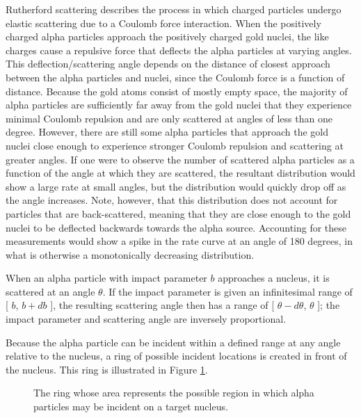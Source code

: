 \documentclass[a4paper]{article}
\begin{document}
\qq Rutherford scattering describes the process in which charged particles
 undergo elastic scattering due to a Coulomb force interaction. When the
positively charged alpha particles approach the positively charged gold nuclei,
the like charges cause a repulsive force that deflects the alpha particles at
varying angles. This deflection/scattering angle depends on the distance of
closest approach between the alpha particles and nuclei, since the Coulomb force
is a function of distance. Because the gold atoms consist of mostly empty space,
the majority of alpha particles are sufficiently far away from the gold nuclei
that they experience minimal Coulomb repulsion and are only scattered at angles
of less than one degree. However, there are still some alpha particles that
approach the gold nuclei close enough to experience stronger Coulomb repulsion
and scattering at greater angles. If one were to observe the number of scattered
alpha particles as a function of the angle at which they are scattered, the
resultant distribution would show a large rate at small angles, but the
distribution would quickly drop off as the angle increases. Note, however, that
this distribution does not account for particles that are back-scattered,
meaning that they are close enough to the gold nuclei to be deflected backwards
towards the alpha source. Accounting for these measurements would show a spike
in the rate curve at an angle of 180 degrees, in what is otherwise a
monotonically decreasing distribution.

\qq When an alpha particle with impact parameter \( b \) approaches a nucleus,
it is scattered at an angle \( \theta \). If the impact parameter is given an
infinitesimal range of [ \( b \), \( b + db \) ], the resulting scattering angle
then has a range of [ \( \theta - d\theta \), \( \theta \) ]; the impact
parameter and scattering angle are inversely proportional.

\qq Because the alpha particle can be incident within a defined range at any
angle relative to the nucleus, a ring of possible incident locations is created
in front of the nucleus. This ring is illustrated in Figure
\ref{fig:crossSecRing}.

\begin{figure}[H]
  \begin{center}
  \end{center}
  \caption{The ring whose area represents the possible region in which alpha
    particles may be incident on a target nucleus.}
  \label{fig:crossSecRing}
\end{figure}
\end{document}
